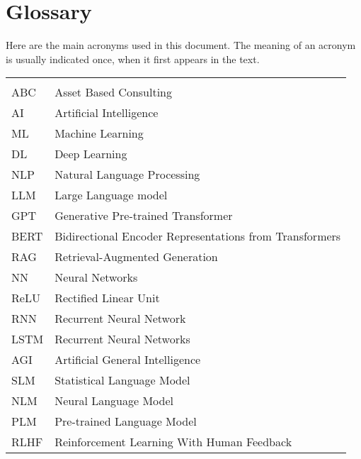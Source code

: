 \chapter*{Glossary}

Here are the main acronyms used in this document. The meaning of an acronym is usually indicated once, when it first appears in the text.

\begin{longtable}{lp{9cm}}
         &                                                         \\
    ABC  & Asset Based Consulting                                  \\
    AI   & Artificial Intelligence                                 \\
    ML   & Machine Learning                                        \\
    DL   & Deep Learning                                           \\
    NLP  & Natural Language Processing                             \\
    LLM  & Large Language model                                    \\
    GPT  & Generative Pre-trained Transformer                      \\
    BERT & Bidirectional Encoder Representations from Transformers \\
    RAG  & Retrieval-Augmented Generation                          \\
    NN   & Neural Networks                                         \\
    ReLU & Rectified Linear Unit                                   \\
    RNN  & Recurrent Neural Network                                \\
    LSTM & Recurrent Neural Networks                               \\
    AGI  & Artificial General Intelligence                         \\
    SLM  & Statistical Language Model                              \\
    NLM  & Neural Language Model                                   \\
    PLM  & Pre-trained Language Model                              \\
    RLHF & Reinforcement Learning With Human Feedback              \\
\end{longtable}

